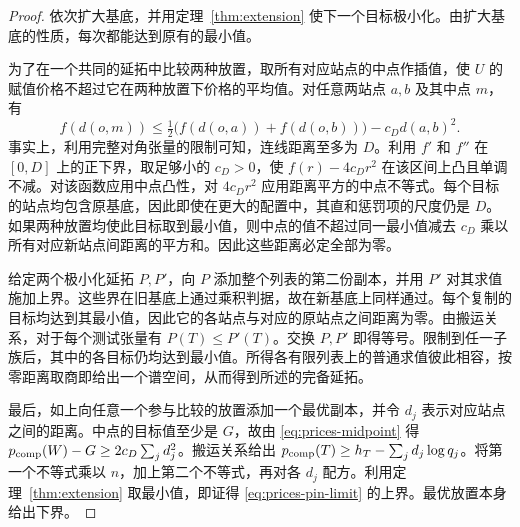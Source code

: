 \begin{proof}
依次扩大基底，并用定理~\ref{thm:extension} 使下一个目标极小化。由扩大基底的性质，每次都能达到原有的最小值。

为了在一个共同的延拓中比较两种放置，取所有对应站点的中点作插值，使 \(U\) 的赋值价格不超过它在两种放置下价格的平均值。对任意两站点 \(a,b\) 及其中点 \(m\)，有
\begin{equation}\label{eq:prices-midpoint}
 f(d(o,m))\le \tfrac12\bigl(f(d(o,a))+f(d(o,b))\bigr)
                  -c_Dd(a,b)^2 .
\end{equation}
事实上，利用完整对角张量的限制可知，连线距离至多为 \(D\)。利用 \(f'\) 和 \(f''\) 在 \([0,D]\) 上的正下界，取足够小的 \(c_D>0\)，使 \(f(r)-4c_Dr^2\) 在该区间上凸且单调不减。对该函数应用中点凸性，对 \(4c_Dr^2\) 应用距离平方的中点不等式。每个目标的站点均包含原基底，因此即使在更大的配置中，其直和惩罚项的尺度仍是 \(D\)。如果两种放置均使此目标取到最小值，则中点的值不超过同一最小值减去 \(c_D\) 乘以所有对应新站点间距离的平方和。因此这些距离必定全部为零。

给定两个极小化延拓 \(P,P'\)，向 \(P\) 添加整个列表的第二份副本，并用 \(P'\) 对其求值施加上界。这些界在旧基底上通过乘积判据，故在新基底上同样通过。每个复制的目标均达到其最小值，因此它的各站点与对应的原站点之间距离为零。由搬运关系，对于每个测试张量有 \(P(T)\le P'(T)\)。交换 \(P,P'\) 即得等号。限制到任一子族后，其中的各目标仍均达到最小值。所得各有限列表上的普通求值彼此相容，按零距离取商即给出一个谱空间，从而得到所述的完备延拓。

最后，如上向任意一个参与比较的放置添加一个最优副本，并令 \(d_j\) 表示对应站点之间的距离。中点的目标值至少是 \(G\)，故由 \eqref{eq:prices-midpoint} 得 \(p_{\rm comp}(W)-G\ge 2c_D\sum_jd_j^2\)。搬运关系给出 \(p_{\rm comp}(T)\ge h_T-\sum_jd_j\log q_j\)。将第一个不等式乘以 \(n\)，加上第二个不等式，再对各 \(d_j\) 配方。利用定理~\ref{thm:extension} 取最小值，即证得 \eqref{eq:prices-pin-limit} 的上界。最优放置本身给出下界。
\end{proof}

